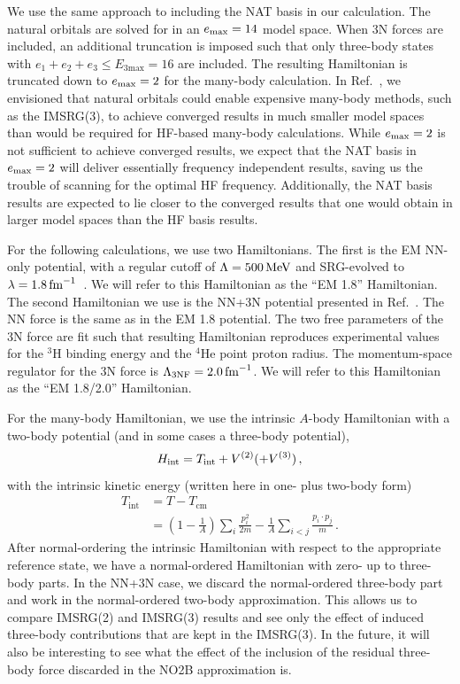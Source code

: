 We use the same approach to including the NAT basis in our calculation.
The natural orbitals are solved for in an $e_{\text{max}}=14$ model space.
When 3N forces are included, an additional truncation is imposed
such that only three-body states with $e_1 + e_2 + e_3 \leq E_{3\text{max}}=16$
are included.
The resulting Hamiltonian is truncated down to $e_{\text{max}}=2$
for the many-body calculation.
In Ref.~\cite{Hopp20natural_orbitals},
we envisioned that natural orbitals
could enable expensive many-body methods, such as the IMSRG(3),
to achieve converged results in much smaller model spaces
than would be required for HF-based many-body calculations.
While $e_{\text{max}}=2$ is not sufficient to achieve converged results,
we expect that the NAT basis in $e_{\text{max}}=2$ will deliver
essentially frequency independent results,
saving us the trouble of scanning for the optimal HF frequency.
Additionally, the NAT basis results
are expected to lie closer to the converged results
that one would obtain in larger model spaces
than the HF basis results.

For the following calculations,
we use two Hamiltonians.
The first is the EM NN-only \nthreelo{} potential,
with a regular cutoff of $\Lambda=500\, \text{MeV}$
and SRG-evolved to $\lambda=1.8\, \text{fm}^{-1}$~\cite{Ente03n3lonn}.
We will refer to this Hamiltonian
as the ``EM 1.8'' Hamiltonian.
The second Hamiltonian we use
is the NN+3N \nthreelo{} potential
presented in Ref.~\cite{Hebe10magic_interaction}.
The NN force is the same as in the EM 1.8 potential.
The two free parameters of the 3N force are fit
such that resulting Hamiltonian reproduces
experimental values for the ${}^{3}\text{H}$ binding energy
and the ${}^{4}\text{He}$ point proton radius.
The momentum-space regulator for the 3N force
is $\Lambda_{\text{3NF}}=2.0 \, \text{fm}^{-1}$.
We will refer to this Hamiltonian
as the ``EM 1.8/2.0'' Hamiltonian.

For the many-body Hamiltonian, we use the intrinsic $A$-body Hamiltonian
with a two-body potential (and in some cases a three-body potential),
\begin{equation}
    H_{\text{int}} = T_{\text{int}} + {V}^{(2)} (+ {V}^{(3)})\,,
\end{equation}
with the intrinsic kinetic energy
(written here in one- plus two-body form)
\begin{align}
    T_{\text{int}} & = T - T_{\text{cm}}                                          \\
                   & = \left(1 - \frac{1}{A}\right) \sum_{i} \frac{p_{i}^{2}}{2m}
    - \frac{1}{A}\sum_{i<j}\frac{p_{i} \cdot p_{j}}{m}\,.
\end{align}
After normal-ordering the intrinsic Hamiltonian
with respect to the appropriate reference state,
we have a normal-ordered Hamiltonian with zero- up to three-body parts.
In the NN+3N case,
we discard the normal-ordered three-body part
and work in the normal-ordered two-body approximation.
This allows us to compare IMSRG(2) and IMSRG(3) results
and see only the effect of induced three-body contributions
that are kept in the IMSRG(3).
In the future,
it will also be interesting to see
what the effect of the inclusion
of the residual three-body force
discarded in the NO2B approximation
is.

